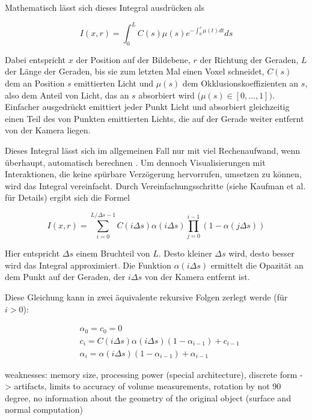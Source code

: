 \documentclass[a4paper,fontsize=12pt,toc=bib,halfparskip]{scrartcl}
\begin{document}
Mathematisch l\"asst sich dieses Integral ausdr\"ucken als

\begin{equation}
	I(x,r) = \int_{0}^{L} C(s)\mu(s) e^{-\int_{0}^{s}\mu(t)dt}ds
\end{equation}

Dabei entspricht $x$ der Position auf der Bildebene, $r$ der Richtung der Geraden, $L$ der L\"ange der Geraden, bis sie zum letzten Mal einen Voxel schneidet, $C(s)$ dem an Position $s$ emittierten Licht und $\mu(s)$ dem Okklusionskoeffizienten an $s$, also dem Anteil von Licht, das an $s$ absorbiert wird ($\mu(s) \in [0, \dots, 1])$. Einfacher ausgedr\"uckt emittiert jeder Punkt Licht und absorbiert gleichzeitig einen Teil des von Punkten emittierten Lichts, die auf der Gerade weiter entfernt von der Kamera liegen.

Dieses Integral l\"asst sich im allgemeinen Fall nur mit viel Rechenaufwand, wenn \"uberhaupt, automatisch berechnen \cite[S.~136]{kaufman2005overview}. Um dennoch Visualisierungen mit Interaktionen, die keine sp\"urbare Verz\"ogerung hervorrufen, umsetzen zu k\"onnen, wird das Integral vereinfacht. Durch Vereinfachungsschritte (siehe Kaufman et al. \cite[S.~136]{kaufman2005overview} f\"ur Details) ergibt sich die Formel

\begin{equation}
	I(x,r) = \sum_{i=0}^{L/\Delta s - 1} C(i\Delta s)\alpha(i\Delta s) \prod_{j=0}^{i-1}( 1 - \alpha(j \Delta s))
\end{equation}

Hier entspricht $\Delta s$ einem Bruchteil von $L$. Desto kleiner $\Delta s$ wird, desto besser wird das Integral approximiert. Die Funktion $\alpha(i \Delta s)$ ermittelt die Opazit\"at an dem Punkt auf der Geraden, der $i \Delta s$ von der Kamera entfernt ist.

Diese Gleichung kann in zwei \"aquivalente rekursive Folgen zerlegt werde (f\"ur $i > 0$):

\begin{align}
	&\alpha_0 = c_0 = 0\\
	&c_i = C(i\Delta s)\alpha(i\Delta s)(1-\alpha_{i-1}) + c_{i-1}\\
	&\alpha_i = \alpha(i \Delta s)(1-\alpha_{i-1}) + \alpha_{i-1} 
\end{align}


weaknesses: memory size, processing power (special architecture), discrete form -> artifacts, limits to accuracy of
volume measurements, rotation by not 90 degree, no information about the geometry of the original object (surface
and normal computation)
\end{document}
